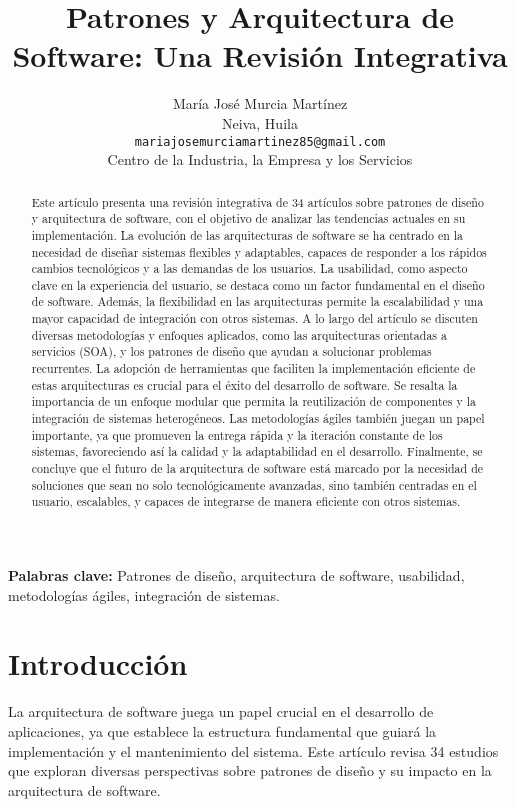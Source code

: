\documentclass[twocolumn]{article}
\title{Patrones y Arquitectura de Software: Una Revisión Integrativa}
\author{María José Murcia Martínez \\ 
        Neiva, Huila \\ 
        \texttt{mariajosemurciamartinez85@gmail.com} \\ 
        Centro de la Industria, la Empresa y los Servicios}
\date{}
\begin{document}
\maketitle
\begin{abstract}
Este artículo presenta una revisión integrativa de 34 artículos sobre patrones de diseño y arquitectura de software, con el objetivo de analizar las tendencias actuales en su implementación. La evolución de las arquitecturas de software se ha centrado en la necesidad de diseñar sistemas flexibles y adaptables, capaces de responder a los rápidos cambios tecnológicos y a las demandas de los usuarios. La usabilidad, como aspecto clave en la experiencia del usuario, se destaca como un factor fundamental en el diseño de software. Además, la flexibilidad en las arquitecturas permite la escalabilidad y una mayor capacidad de integración con otros sistemas. A lo largo del artículo se discuten diversas metodologías y enfoques aplicados, como las arquitecturas orientadas a servicios (SOA), y los patrones de diseño que ayudan a solucionar problemas recurrentes. La adopción de herramientas que faciliten la implementación eficiente de estas arquitecturas es crucial para el éxito del desarrollo de software. Se resalta la importancia de un enfoque modular que permita la reutilización de componentes y la integración de sistemas heterogéneos. Las metodologías ágiles también juegan un papel importante, ya que promueven la entrega rápida y la iteración constante de los sistemas, favoreciendo así la calidad y la adaptabilidad en el desarrollo. Finalmente, se concluye que el futuro de la arquitectura de software está marcado por la necesidad de soluciones que sean no solo tecnológicamente avanzadas, sino también centradas en el usuario, escalables, y capaces de integrarse de manera eficiente con otros sistemas.

\end{abstract}
\textbf{Palabras clave:} Patrones de diseño, arquitectura de software, usabilidad, metodologías ágiles, integración de sistemas.
\section{Introducción}
La arquitectura de software juega un papel crucial en el desarrollo de aplicaciones, ya que establece la estructura fundamental que guiará la implementación y el mantenimiento del sistema. Este artículo revisa 34 estudios que exploran diversas perspectivas sobre patrones de diseño y su impacto en la arquitectura de software.
\end{document}
